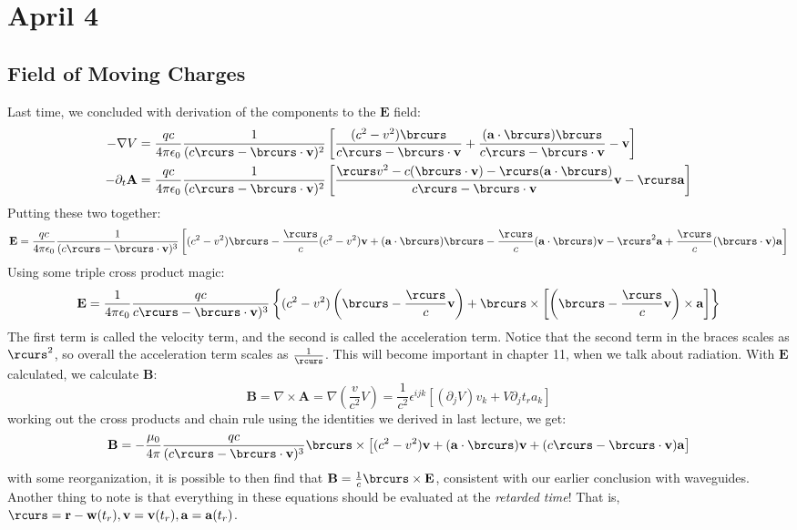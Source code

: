 \section{April 4}
\subsection{Field of Moving Charges}
Last time, we concluded with derivation of the components to the \( \mathbf{E} \) field:   
\begin{align*}
	-\nabla V &= \frac{qc}{4 \pi \epsilon_0} \frac{1}{(c \rcurs - \brcurs \cdot \mathbf{v})^2} \left[
	\frac{(c^2 - v^2) \brcurs}{c \rcurs - \brcurs \cdot \mathbf{v}} + \frac{(\mathbf{a} \cdot \brcurs)
\brcurs}{c \rcurs - \brcurs \cdot \mathbf{v}} - \mathbf{v} \right]\\
		-\partial_t \mathbf{A} &= \frac{qc}{4\pi \epsilon_0} \frac{1}{(c \rcurs - \brcurs \cdot \mathbf{v})^2}
	\left[ \frac{\rcurs v^2 - c (\brcurs \cdot \mathbf{v}) - \rcurs (\mathbf{a} \cdot \brcurs)}{c \rcurs -
	\brcurs \cdot \mathbf{v}} \mathbf{v} - \rcurs \mathbf{a} \right]	
\end{align*}
Putting these two together:
\[
	\mathbf{E} = \frac{qc}{4\pi \epsilon_0} \frac{1}{(c\rcurs - \brcurs \cdot \mathbf{v})^3} \left[ (c^2 -
	v^2) \brcurs - \frac{\rcurs}{c}(c^2 - v^2) \mathbf{v} + (\mathbf{a} \cdot \brcurs) \brcurs -
	\frac{\rcurs}{c} (\mathbf{a} \cdot \brcurs) \mathbf{v} - \rcurs^2 \mathbf{a} + \frac{\rcurs}{c}(\brcurs \cdot
	\mathbf{v}) \mathbf{a}\right]
\]
Using some triple cross product magic:
\[
	\mathbf{E} = \frac{1}{4\pi \epsilon_0}\frac{qc}{c \rcurs - \brcurs \cdot \mathbf{v})^3} \left\{ (c^2 -
	v^2) \left( \brcurs - \frac{\rcurs}{c} \mathbf{v} \right) + \brcurs \times \left[ \left( \brcurs -
\frac{\rcurs}{c} \mathbf{v} \right) \times \mathbf{a} \right] \right\}
\]
The first term is called the velocity term, and the second is called the acceleration term. Notice that the
second term in the braces scales as \( \rcurs^2 \), so overall the acceleration term scales as \(
\frac{1}{\rcurs} \). This will become important in chapter 11, when we talk about radiation. With \(
\mathbf{E} \) calculated, we calculate \( \mathbf{B} \):
\[
	\mathbf{B} = \nabla \times \mathbf{A} = \nabla\left( \frac{v}{c^2} V \right) = 
	\frac{1}{c^2}\epsilon^{ijk} \left[ (\partial_j V) v_k  + V \partial_j t_r a_k \right]
\]
working out the cross products and chain rule using the identities we derived in last lecture, we get:
\[
	\mathbf{B} = -\frac{\mu_0}{4\pi} \frac{qc}{(c \rcurs - \brcurs \cdot \mathbf{v})^3} \brcurs \times \left[
	(c^2 - v^2) \mathbf{v} + (\mathbf{a} \cdot \brcurs) \mathbf{v} + (c \rcurs - \brcurs \cdot \mathbf{v})
\mathbf{a} \right]
\]
with some reorganization, it is possible to then find that \( \mathbf{B} = \frac{1}{c} \brcurs \times
\mathbf{E} \), consistent with our earlier conclusion with waveguides. 
Another thing to note is that everything in these equations should be evaluated at the
\textit{retarded time}! That is, \( \rcurs = \mathbf{r} - \mathbf{w}(t_r), \mathbf{v} = \mathbf{v}(t_r), 
\mathbf{a} = \mathbf{a}(t_r) \). 

